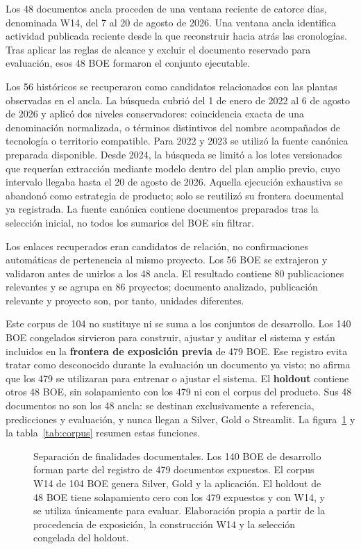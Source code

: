 Los 48 documentos ancla proceden de una ventana reciente de catorce días,
denominada W14, del 7 al 20 de agosto de 2026. Una ventana ancla identifica
actividad publicada reciente desde la que reconstruir hacia atrás las
cronologías. Tras aplicar las reglas de alcance y excluir el documento
reservado para evaluación, esos 48 BOE formaron el conjunto ejecutable.

Los 56 históricos se recuperaron como candidatos relacionados con las plantas
observadas en el ancla. La búsqueda cubrió del 1 de enero de 2022 al 6 de agosto
de 2026 y aplicó dos niveles conservadores: coincidencia exacta de una
denominación normalizada, o términos distintivos del nombre acompañados de
tecnología o territorio compatible. Para 2022 y 2023 se utilizó la fuente
canónica preparada disponible. Desde 2024, la búsqueda se limitó a los lotes
versionados que requerían extracción mediante modelo dentro del plan amplio
previo, cuyo intervalo llegaba hasta el 20 de agosto de 2026. Aquella ejecución
exhaustiva se abandonó como estrategia de producto; solo se reutilizó su
frontera documental ya registrada. La fuente canónica contiene documentos
preparados tras la selección inicial, no todos los sumarios del BOE sin filtrar.

Los enlaces recuperados eran candidatos de relación, no confirmaciones
automáticas de pertenencia al mismo proyecto. Los 56 BOE se extrajeron y
validaron antes de unirlos a los 48 ancla. El resultado contiene 80
publicaciones relevantes y se agrupa en 86 proyectos; documento analizado,
publicación relevante y proyecto son, por tanto, unidades diferentes.

Este corpus de 104 no sustituye ni se suma a los conjuntos de desarrollo. Los
140 BOE congelados sirvieron para construir, ajustar y auditar el sistema y
están incluidos en la \textbf{frontera de exposición previa} de 479 BOE. Ese
registro evita tratar como desconocido durante la evaluación un documento ya
visto; no afirma que los 479 se utilizaran para entrenar o ajustar el sistema.
El \textbf{holdout} contiene otros 48 BOE, sin solapamiento con los 479 ni con
el corpus del producto. Sus 48 documentos no son los 48 ancla: se destinan
exclusivamente a referencia, predicciones y evaluación, y nunca llegan a
Silver, Gold o Streamlit. La figura~\ref{fig:conjuntos-documentales} y la
tabla~\ref{tab:corpus} resumen estas funciones.

\begin{figure}[p]
\centering

\caption[Desarrollo, producto y evaluación]{Separación de finalidades
documentales. Los 140 BOE de desarrollo forman parte del registro de 479
documentos expuestos. El corpus W14 de 104 BOE genera Silver, Gold y la
aplicación. El holdout de 48 BOE tiene solapamiento cero con los 479 expuestos
y con W14, y se utiliza únicamente para evaluar. Elaboración propia a partir
de la procedencia de exposición, la construcción W14 y la selección congelada
del holdout.}
\label{fig:conjuntos-documentales}
\end{figure}

